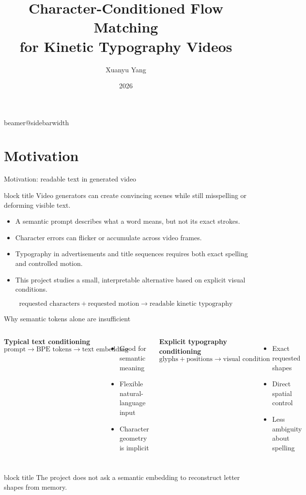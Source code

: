 \documentclass[aspectratio=169,xcolor=svgnames]{beamer}
\title{Character-Conditioned Flow Matching\\for Kinetic Typography Videos}
\author[]{Xuanyu Yang}
\institute{PRIME Final Project}
\date{2026}
\newcommand{\keypoint}[1]{%
\begin{center}
\begin{beamercolorbox}[rounded=true,shadow=true,wd=0.88\textwidth,sep=0.6em,center]{block title}
#1
\end{beamercolorbox}
\end{center}
}
\begin{document}
\begingroup
\makeatletter
\ifcsname beamer@sidebarwidth\endcsname
\setlength{\hoffset}{.5\beamer@sidebarwidth}
\fi
\makeatother
\begin{frame}[plain]
\maketitle
\end{frame}
\endgroup

\section{Motivation}

\begin{frame}{Motivation: readable text in generated video}
\keypoint{Video generators can create convincing scenes while still misspelling or deforming visible text.}

\begin{itemize}
    \item A semantic prompt describes what a word means, but not its exact strokes.
    \item Character errors can flicker or accumulate across video frames.
    \item Typography in advertisements and title sequences requires both exact spelling and controlled motion.
    \item This project studies a small, interpretable alternative based on explicit visual conditions.
\end{itemize}

\[
\text{requested characters}+\text{requested motion}
\longrightarrow
\text{readable kinetic typography}
\]
\end{frame}

\begin{frame}{Why semantic tokens alone are insufficient}
\begin{columns}[T]
\textbf{Typical text conditioning}
\[
\text{prompt}\to\text{BPE tokens}\to\text{text embedding}
\]
\begin{itemize}
    \item Good for semantic meaning
    \item Flexible natural-language input
    \item Character geometry is implicit
\end{itemize}

\textbf{Explicit typography conditioning}
\[
\text{glyphs}+\text{positions}\to\text{visual condition}
\]
\begin{itemize}
    \item Exact requested shapes
    \item Direct spatial control
    \item Less ambiguity about spelling
\end{itemize}
\end{columns}

\keypoint{The project does not ask a semantic embedding to reconstruct letter shapes from memory.}
\end{frame}
\end{document}

